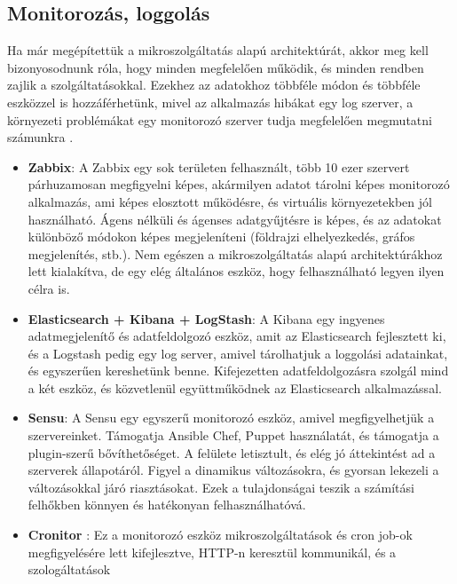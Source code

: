 \documentclass[11pt,magyar,a4paper,twoside,]{report}
\begin{document}
\subsection{Monitorozás, loggolás}\label{monitorozuxe1s-loggoluxe1s}

Ha már megépítettük a mikroszolgáltatás alapú architektúrát, akkor meg
kell bizonyosodnunk róla, hogy minden megfelelően működik, és minden
rendben zajlik a szolgáltatásokkal. Ezekhez az adatokhoz többféle módon
és többféle eszközzel is hozzáférhetünk, mivel az alkalmazás hibákat egy
log szerver, a környezeti problémákat egy monitorozó szerver tudja
megfelelően megmutatni számunkra\citep{micro-service-monitoring}
\citep{microservice-monitoring}.

\begin{itemize}
\item
  \textbf{Zabbix}\citep{zabbix}: A Zabbix egy sok területen felhasznált,
  több 10 ezer szervert párhuzamosan megfigyelni képes, akármilyen
  adatot tárolni képes monitorozó alkalmazás, ami képes elosztott
  működésre, és virtuális környezetekben jól használható. Ágens nélküli
  és ágenses adatgyűjtésre is képes, és az adatokat különböző módokon
  képes megjeleníteni (földrajzi elhelyezkedés, gráfos megjelenítés,
  stb.). Nem egészen a mikroszolgáltatás alapú architektúrákhoz lett
  kialakítva, de egy elég általános eszköz, hogy felhasználható legyen
  ilyen célra is.
\item
  \textbf{Elasticsearch + Kibana\citep{kibana} +
  LogStash}\citep{logstash}: A Kibana egy ingyenes adatmegjelenítő és
  adatfeldolgozó eszköz, amit az Elasticsearch fejlesztett ki, és a
  Logstash pedig egy log server, amivel tárolhatjuk a loggolási
  adatainkat, és egyszerűen kereshetünk benne. Kifejezetten
  adatfeldolgozásra szolgál mind a két eszköz, és közvetlenül
  együttműködnek az Elasticsearch alkalmazással.
\item
  \textbf{Sensu}\citep{sensu}: A Sensu egy egyszerű monitorozó eszköz,
  amivel megfigyelhetjük a szervereinket. Támogatja Ansible Chef, Puppet
  használatát, és támogatja a plugin-szerű bővíthetőséget. A felülete
  letisztult, és elég jó áttekintést ad a szerverek állapotáról. Figyel
  a dinamikus változásokra, és gyorsan lekezeli a változásokkal járó
  riasztásokat. Ezek a tulajdonságai teszik a számítási felhőkben
  könnyen és hatékonyan felhasználhatóvá.
\item
  \textbf{Cronitor}\citep{cronitor} \citep{cron-monitoring}: Ez a
  monitorozó eszköz mikroszolgáltatások és cron job-ok megfigyelésére
  lett kifejlesztve, HTTP-n keresztül kommunikál, és a szologáltatások

\end{itemize}
\end{document}
